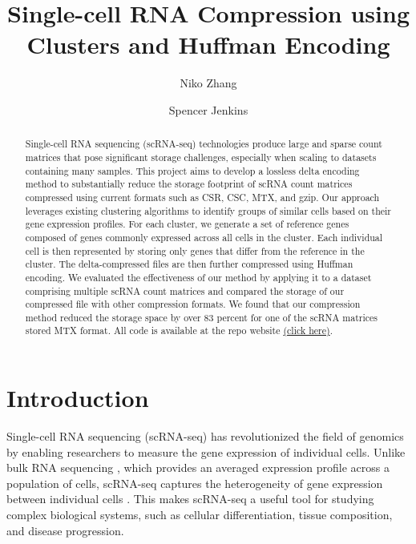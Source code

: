 \documentclass[unnumsec,webpdf,contemporary,large]{oup-authoring-template}
\begin{document}
\title[Single-cell RNA Compression using Clusters and Huffman Encoding]{Single-cell RNA Compression using Clusters and Huffman Encoding}
\author[1]{Niko Zhang}
\author[2]{Spencer Jenkins}
\address[1,2]{, , }

\maketitle

\begin{abstract}

Single-cell RNA sequencing (scRNA-seq) technologies produce large and sparse count matrices that pose significant storage challenges, especially when scaling to datasets containing many samples. This project aims to develop a lossless delta encoding method to substantially reduce the storage footprint of scRNA count matrices compressed using current formats such as CSR, CSC, MTX, and gzip. Our approach leverages existing clustering algorithms to identify groups of similar cells based on their gene expression profiles. For each cluster, we generate a set of reference genes composed of genes commonly expressed across all cells in the cluster. Each individual cell is then represented by storing only genes that differ from the reference in the cluster. The delta-compressed files are then further compressed using Huffman encoding. We evaluated the effectiveness of our method by applying it to a dataset comprising multiple scRNA count matrices and compared the storage of our compressed file with other compression formats. We found that our compression method reduced the storage space by over 83 percent for one of the scRNA matrices stored MTX format. All code is available at the repo website \href{https://github.com/Neko-23/scRNA_Compression}{(click here)}.
\end{abstract}

\section{Introduction}
Single-cell RNA sequencing (scRNA-seq) has revolutionized the field of genomics by enabling researchers to measure the gene expression of individual cells. Unlike bulk RNA sequencing \cite{rna_seq_teenage_years}, which provides an averaged expression profile across a population of cells, scRNA-seq captures the heterogeneity of gene expression between individual cells \cite{scRNA_overview}. This makes scRNA-seq a useful tool for studying complex biological systems, such as cellular differentiation, tissue composition, and disease progression.
\end{document}
